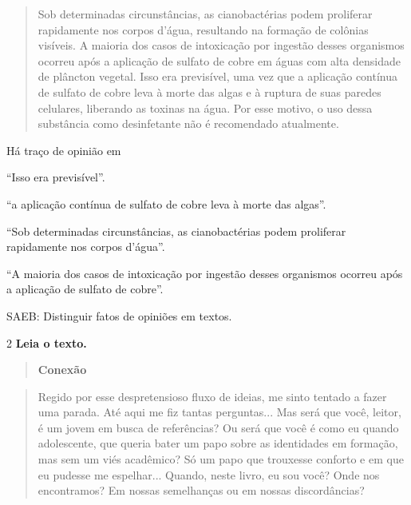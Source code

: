\begin{quote}
Sob determinadas circunstâncias, as cianobactérias podem proliferar
rapidamente nos corpos d'água, resultando na formação de colônias
visíveis. A maioria dos casos de intoxicação por ingestão desses
organismos ocorreu após a aplicação de sulfato de cobre em águas com
alta densidade de plâncton vegetal. Isso era previsível, uma vez que a
aplicação contínua de sulfato de cobre leva à morte das algas e à
ruptura de suas paredes celulares, liberando as toxinas na água. Por
esse motivo, o uso dessa substância como desinfetante não é recomendado
atualmente.
\end{quote}


Há traço de opinião em

\begin{escolha}

\item ``Isso era previsível''.

\item ``a aplicação contínua de sulfato de cobre leva à morte das algas''.

\item ``Sob determinadas circunstâncias, as cianobactérias podem proliferar
rapidamente nos corpos d'água''.

\item ``A maioria dos casos de intoxicação por ingestão desses organismos
ocorreu após a aplicação de sulfato de cobre''.
\end{escolha}

SAEB: Distinguir fatos de opiniões em textos.

\num{2} \textbf{Leia o texto.}

\begin{quote}
\textbf{Conexão}
\end{quote}

\begin{quote}
Regido por esse despretensioso fluxo de ideias, me sinto tentado a fazer
uma parada. Até aqui me fiz tantas perguntas... Mas será que você,
leitor, é um jovem em busca de referências? Ou será que você é como eu
quando adolescente, que queria bater um papo sobre as identidades em
formação, mas sem um viés acadêmico? Só um papo que trouxesse conforto e
em que eu pudesse me espelhar... Quando, neste livro, eu sou você? Onde
nos encontramos? Em nossas semelhanças ou em nossas discordâncias?
\end{quote}

